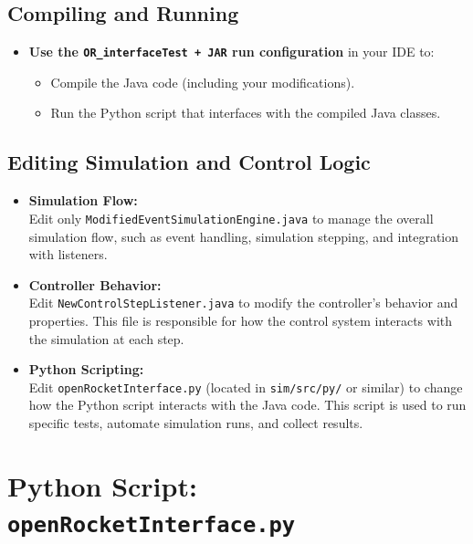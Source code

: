 \documentclass{amsdtx}
\providecommand{\tightlist}{%
  \setlength{\itemsep}{0pt}\setlength{\parskip}{0pt}}
\begin{document}
\subsection{Compiling and Running}\label{compiling-and-running}

\begin{itemize}
\tightlist
\item
  \textbf{Use the \texttt{OR\_interfaceTest\ +\ JAR} run configuration}
  in your IDE to:

  \begin{itemize}
  \tightlist
  \item
    Compile the Java code (including your modifications).
  \item
    Run the Python script that interfaces with the compiled Java
    classes.
  \end{itemize}
\end{itemize}

\subsection{Editing Simulation and Control
Logic}\label{editing-simulation-and-control-logic}

\begin{itemize}
\item
  \textbf{Simulation Flow:}\\
  Edit only \texttt{ModifiedEventSimulationEngine.java} to manage the
  overall simulation flow, such as event handling, simulation stepping,
  and integration with listeners.
\item
  \textbf{Controller Behavior:}\\
  Edit \texttt{NewControlStepListener.java} to modify the controller's
  behavior and properties. This file is responsible for how the control
  system interacts with the simulation at each step.
\item
  \textbf{Python Scripting:}\\
  Edit \texttt{openRocketInterface.py} (located in \texttt{sim/src/py/}
  or similar) to change how the Python script interacts with the Java
  code. This script is used to run specific tests, automate simulation
  runs, and collect results.
\end{itemize}

\section{\texorpdfstring{Python Script:
\texttt{openRocketInterface.py}}{Python Script: openRocketInterface.py}}\label{python-script-openrocketinterface.py}
\end{document}
